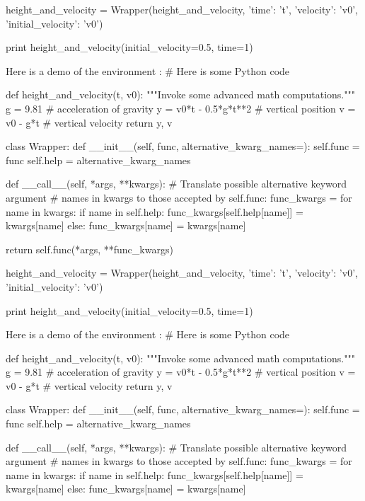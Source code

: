 height_and_velocity = Wrapper(height_and_velocity,
                              {'time': 't',
                               'velocity': 'v0',
                               'initial_velocity': 'v0'})

print height_and_velocity(initial_velocity=0.5, time=1)


\noindent
Here is a demo of the environment :
# Here is some Python code

def height_and_velocity(t, v0):
    """Invoke some advanced math computations."""
    g = 9.81                  # acceleration of gravity
    y = v0*t - 0.5*g*t**2     # vertical position
    v = v0 - g*t              # vertical velocity
    return y, v

class Wrapper:
    def __init__(self, func, alternative_kwarg_names={}):
        self.func = func
        self.help = alternative_kwarg_names

    def __call__(self, *args, **kwargs):
        # Translate possible alternative keyword argument
        # names in kwargs to those accepted by self.func:
        func_kwargs = {}
        for name in kwargs:
            if name in self.help:
                func_kwargs[self.help[name]] = kwargs[name]
            else:
                func_kwargs[name] = kwargs[name]

        return self.func(*args, **func_kwargs)

height_and_velocity = Wrapper(height_and_velocity,
                              {'time': 't',
                               'velocity': 'v0',
                               'initial_velocity': 'v0'})

print height_and_velocity(initial_velocity=0.5, time=1)


\noindent
Here is a demo of the environment :
# Here is some Python code

def height_and_velocity(t, v0):
    """Invoke some advanced math computations."""
    g = 9.81                  # acceleration of gravity
    y = v0*t - 0.5*g*t**2     # vertical position
    v = v0 - g*t              # vertical velocity
    return y, v

class Wrapper:
    def __init__(self, func, alternative_kwarg_names={}):
        self.func = func
        self.help = alternative_kwarg_names

    def __call__(self, *args, **kwargs):
        # Translate possible alternative keyword argument
        # names in kwargs to those accepted by self.func:
        func_kwargs = {}
        for name in kwargs:
            if name in self.help:
                func_kwargs[self.help[name]] = kwargs[name]
            else:
                func_kwargs[name] = kwargs[name]

